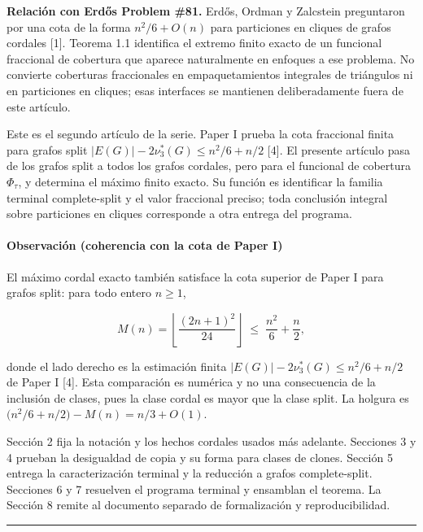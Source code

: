 \documentclass[spanish,11pt,a4paper]{article}
\begin{document}
\textbf{Relación con Erdős Problem \#81.} Erdős, Ordman y Zalcstein
preguntaron por una cota de la forma \(n^2/6+O(n)\) para particiones en
cliques de grafos cordales {[}1{]}. Teorema 1.1 identifica el extremo
finito exacto de un funcional fraccional de cobertura que aparece
naturalmente en enfoques a ese problema. No convierte coberturas
fraccionales en empaquetamientos integrales de triángulos ni en
particiones en cliques; esas interfaces se mantienen deliberadamente
fuera de este artículo.

Este es el segundo artículo de la serie. Paper I prueba la cota
fraccional finita para grafos split \(|E(G)|-2\nu_3^*(G)\le n^2/6+n/2\)
{[}4{]}. El presente artículo pasa de los grafos split a todos los
grafos cordales, pero para el funcional de cobertura \(\Phi_\tau\), y
determina el máximo finito exacto. Su función es identificar la familia
terminal complete-split y el valor fraccional preciso; toda conclusión
integral sobre particiones en cliques corresponde a otra entrega del
programa.

\paragraph{Observación (coherencia con la cota de Paper
I)}\label{observaciuxf3n-coherencia-con-la-cota-de-paper-i}

El máximo cordal exacto también satisface la cota superior de Paper I
para grafos split: para todo entero \(n\ge1\),

\[
M(n)=\left\lfloor\frac{(2n+1)^2}{24}\right\rfloor
\;\le\;
\frac{n^2}{6}+\frac{n}{2},
\]

donde el lado derecho es la estimación finita
\(|E(G)|-2\nu_3^*(G)\le n^2/6+n/2\) de Paper I {[}4{]}. Esta comparación
es numérica y no una consecuencia de la inclusión de clases, pues la
clase cordal es mayor que la clase split. La holgura es
\(\bigl(n^2/6+n/2\bigr)-M(n)=n/3+O(1)\).

Sección 2 fija la notación y los hechos cordales usados más adelante.
Secciones 3 y 4 prueban la desigualdad de copia y su forma para clases
de clones. Sección 5 entrega la caracterización terminal y la reducción
a grafos complete-split. Secciones 6 y 7 resuelven el programa terminal
y ensamblan el teorema. La Sección 8 remite al documento separado de
formalización y reproducibilidad.

\begin{center}\rule{0.5\linewidth}{0.5pt}\end{center}
\end{document}
